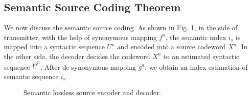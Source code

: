 \documentclass[12pt, draftclsnofoot,onecolumn]{IEEEtran}
\begin{document}
\subsection{Semantic Source Coding Theorem}
We now discuss the semantic source coding. As shown in Fig. \ref{Semantic_Source_coding}, in the side of transmitter, with the help of synonymous mapping $f^n$, the semantic index $i_s$ is mapped into a syntactic sequence $U^n$ and encoded into a source codeword $X^n$. In the other side, the decoder decides the codeword $X^n$ to an estimated syntactic sequence $\hat{U}^n$. After de-synonymous mapping $g^n$, we obtain an index estimation of semantic sequence $\hat{i}_s$.

\begin{figure}[htbp]
\setlength{\abovecaptionskip}{0.cm}
\setlength{\belowcaptionskip}{-0.cm}
  \caption{Semantic lossless source encoder and decoder.}\label{Semantic_Source_coding}
\end{figure}
\end{document}
